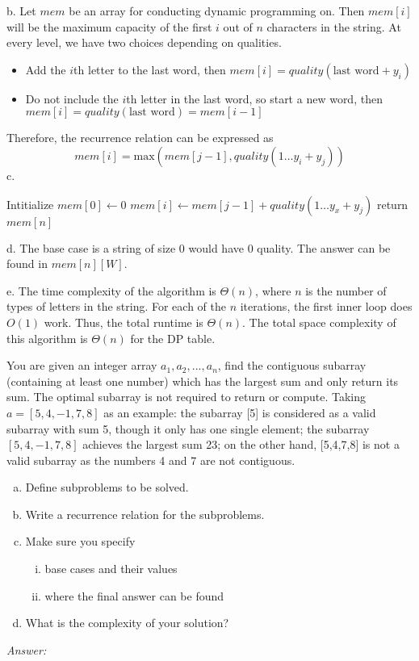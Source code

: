 \documentclass[12pt]{article}
\newenvironment{problem}[2][Problem]{\begin{trivlist}
\item[\hskip \labelsep {\bfseries #1}\hskip \labelsep {\bfseries #2.}]}{\end{trivlist}}
\begin{document}
b. Let $mem$ be an array for conducting dynamic programming on. Then $mem[i]$ will be the maximum capacity of the first $i$ out of $n$ characters in the string. At every level, we have two choices depending on qualities.
\begin{itemize}
    \item Add the $i$th letter to the last word, then $mem[i] = quality(\text{last word} + y_i)$
    \item Do not include the $i$th letter in the last word, so start a new word, then $mem[i] = quality(\text{last word}) = mem[i-1]$
\end{itemize}
Therefore, the recurrence relation can be expressed as 
$$
mem[i]= \text{max}(mem[j-1], quality(1 \dots y_i +  y_j))
$$
c. \begin{algorithmic}
        \State Intitialize $mem[0] \gets 0$
                    \State $mem[i] \gets mem[j-1] + quality(1 \dots y_x + y_j)$
                \EndIf
            \EndFor
        \EndFor
        \State return $mem[n]$
    \EndProcedure
\end{algorithmic}

d. The base case is a string of size 0 would have 0 quality. The answer can be found in $mem[n][W]$.

e. The time complexity of the algorithm is $\Theta(n)$, where $n$ is the number of types of letters in the string. For each of the $n$ iterations, the first inner loop does $O(1)$ work. Thus, the total runtime is $\Theta(n)$. The total space complexity of this algorithm is $\Theta(n)$ for the DP table.

\begin{problem}{2}
    You are given an integer array $a_1, a_2, ..., a_n$, find the contiguous subarray (containing at least one number) which has the largest sum and only return its sum. The optimal subarray is not required to return or compute. Taking $a=[5,4,-1,7,8]$ as an example: the subarray [5] is considered as a valid subarray with sum 5, though it only has one single element; the subarray $[5,4,-1,7,8]$ achieves the largest sum 23; on the other hand, [5,4,7,8] is not a valid subarray as the numbers 4 and 7 are not contiguous.

    \begin{enumerate}[a.]
        \item Define subproblems to be solved.
        \item Write a recurrence relation for the subproblems.
        \item Make sure you specify
        \begin{enumerate}[i.]
            \item base cases and their values
            \item where the final answer can be found
        \end{enumerate}
        \item What is the complexity of your solution?
    \end{enumerate}
\end{problem}
\textit{Answer:}
\end{document}
